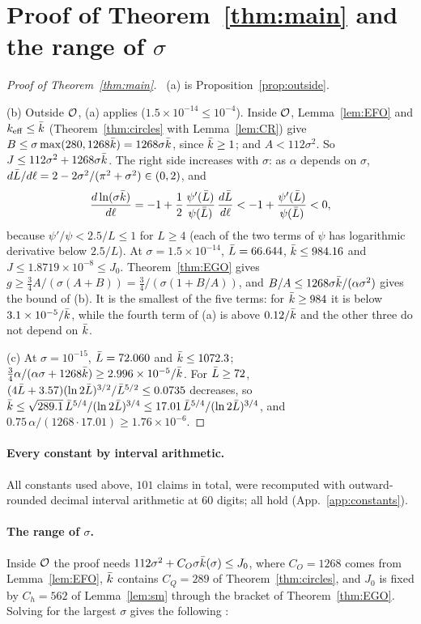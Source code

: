 \section{Proof of Theorem~\ref{thm:main} and the range of $\sigma$}
\label{sec:assembly}

\begin{proof}[Proof of Theorem~\ref{thm:main}]\proofst\
(a) is Proposition~\ref{prop:outside}.

(b) Outside $\mathcal O$, (a) applies ($1.5\times10^{-14}\le10^{-4}$).
Inside $\mathcal O$, Lemma~\ref{lem:EFO} and $k_{\mathrm{eff}}\le\bar k$ (Theorem~\ref{thm:circles} with Lemma~\ref{lem:CR}) give $B\le\sigma\max(280,1268\bar k)=1268\sigma\bar k$, since $\bar k\ge1$; and $A<112\sigma^2$.
So $J\le112\sigma^2+1268\sigma\bar k$.
The right side increases with $\sigma$: as $\alpha$ depends on $\sigma$, $d\bar L/d\ell=2-2\sigma^2/(\pi^2+\sigma^2)\in(0,2)$, and
\[
\frac{d\ln(\sigma\bar k)}{d\ell}=-1+\frac12\,\frac{\psi'(\bar L)}{\psi(\bar L)}\,\frac{d\bar L}{d\ell}<-1+\frac{\psi'(\bar L)}{\psi(\bar L)}<0,
\]
because $\psi'/\psi<2.5/L\le1$ for $L\ge4$ (each of the two terms of $\psi$ has logarithmic derivative below $2.5/L$).
At $\sigma=1.5\times10^{-14}$, $\bar L=66.644$, $\bar k\le984.16$ and $J\le1.8719\times10^{-8}\le J_0$.
Theorem~\ref{thm:EGO} gives $g\ge\frac34A/(\sigma(A+B))=\frac34/(\sigma(1+B/A))$, and $B/A\le1268\sigma\bar k/(\alpha\sigma^2)$ gives the bound of (b).
It is the smallest of the five terms: for $\bar k\ge984$ it is below $3.1\times10^{-5}/\bar k$, while the fourth term of (a) is above $0.12/\bar k$ and the other three do not depend on $\bar k$.

(c) At $\sigma=10^{-15}$, $\bar L=72.060$ and $\bar k\le1072.3$; $\frac34\alpha/(\alpha\sigma+1268\bar k)\ge2.996\times10^{-5}/\bar k$.
For $\bar L\ge72$, $(4\bar L+3.57)(\ln2\bar L)^{3/2}/\bar L^{5/2}\le0.0735$ decreases, so $\bar k\le\sqrt{289.1}\,\bar L^{5/4}/(\ln2\bar L)^{3/4}\le17.01\,\bar L^{5/4}/(\ln2\bar L)^{3/4}$, and $0.75\,\alpha/(1268\cdot17.01)\ge1.76\times10^{-6}$.
\end{proof}

\paragraph*{Every constant by interval arithmetic.}
All constants used above, $101$ claims in total, were recomputed with outward-rounded decimal interval arithmetic at $60$ digits; all hold (App.~\ref{app:constants}).

\paragraph*{The range of $\sigma$.}
Inside $\mathcal O$ the proof needs $112\sigma^2+C_O\sigma\bar k(\sigma)\le J_0$, where $C_O=1268$ comes from Lemma~\ref{lem:EFO}, $\bar k$ contains $C_Q=289$ of Theorem~\ref{thm:circles}, and $J_0$ is fixed by $C_h=562$ of Lemma~\ref{lem:sm} through the bracket of Theorem~\ref{thm:EGO}.
Solving for the largest $\sigma$ gives the following \derivst:

